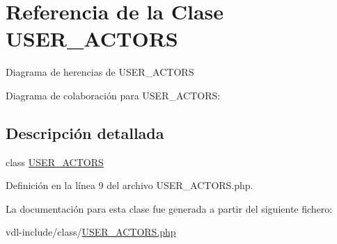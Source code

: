 \hypertarget{classUSER__ACTORS}{\section{Referencia de la Clase U\-S\-E\-R\-\_\-\-A\-C\-T\-O\-R\-S}
\label{classUSER__ACTORS}
}


Diagrama de herencias de U\-S\-E\-R\-\_\-\-A\-C\-T\-O\-R\-S


Diagrama de colaboración para U\-S\-E\-R\-\_\-\-A\-C\-T\-O\-R\-S\-:


\subsection{Descripción detallada}
class \hyperlink{classUSER__ACTORS}{U\-S\-E\-R\-\_\-\-A\-C\-T\-O\-R\-S} 

Definición en la línea 9 del archivo U\-S\-E\-R\-\_\-\-A\-C\-T\-O\-R\-S.\-php.



La documentación para esta clase fue generada a partir del siguiente fichero\-:\begin{DoxyCompactItemize}
\item 
vdl-\/include/class/\hyperlink{USER__ACTORS_8php}{U\-S\-E\-R\-\_\-\-A\-C\-T\-O\-R\-S.\-php}\end{DoxyCompactItemize}
